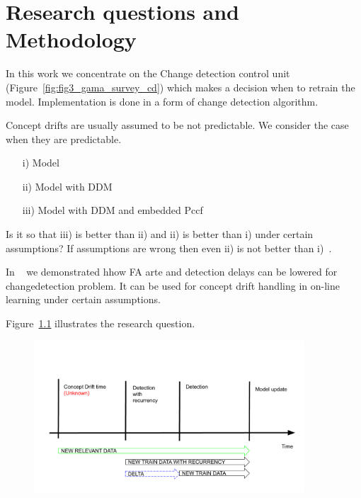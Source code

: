 \chapter{Research questions and Methodology}

In this work we concentrate on the Change detection control unit (Figure~\ref{fig:fig3_gama_survey_cd}) which makes a decision when to retrain the model.
Implementation is done in a form of change detection algorithm.

Concept drifts are usually assumed to be not predictable.
We consider the case when they are predictable.



\begin{itemize}
  \item [i)] Model
  \item [ii)] Model with DDM
  \item [iii)] Model with DDM and embedded Pccf
\end{itemize}

Is it so that iii) is better than ii) and ii) is better than i) under certain assumptions?
If assumptions are wrong then even ii) is not better than i)~\cite{SouzaRMB20}.

In ~\cite{XXX} we demonstrated hhow FA arte and detection delays can be lowered for changedetection problem.
It can be used for concept drift handling in on-line learning under certain assumptions.


Figure~\ref{fig:research_question} illustrates the research question.
\begin{figure}[htb!]
	\centering
	\includegraphics[width=0.9\textwidth]{images/google_slides/scheme_cd_recurrency}
  \caption{
	}\label{fig:research_question}
\end{figure}
